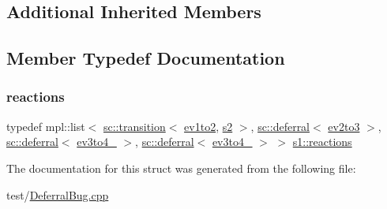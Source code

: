 \subsection*{Additional Inherited Members}


\subsection{Member Typedef Documentation}
\mbox{\label{structs1_aab00d2901c9b72bb435f9c0f569ee0f5}} 
\subsubsection{\texorpdfstring{reactions}{reactions}}
{\footnotesize\ttfamily typedef mpl\+::list$<$ \mbox{\hyperlink{classboost_1_1statechart_1_1transition}{sc\+::transition}}$<$ \mbox{\hyperlink{structev1to2}{ev1to2}}, \mbox{\hyperlink{structs2}{s2}} $>$, \mbox{\hyperlink{classboost_1_1statechart_1_1deferral}{sc\+::deferral}}$<$ \mbox{\hyperlink{structev2to3}{ev2to3}} $>$, \mbox{\hyperlink{classboost_1_1statechart_1_1deferral}{sc\+::deferral}}$<$ \mbox{\hyperlink{structev3to4__1}{ev3to4\+\_}} $>$, \mbox{\hyperlink{classboost_1_1statechart_1_1deferral}{sc\+::deferral}}$<$ \mbox{\hyperlink{structev3to4__2}{ev3to4\+\_}} $>$ $>$ \mbox{\hyperlink{structs1_aab00d2901c9b72bb435f9c0f569ee0f5}{s1\+::reactions}}}



The documentation for this struct was generated from the following file\+:\begin{DoxyCompactItemize}
\item 
test/\mbox{\hyperlink{_deferral_bug_8cpp}{Deferral\+Bug.\+cpp}}\end{DoxyCompactItemize}
